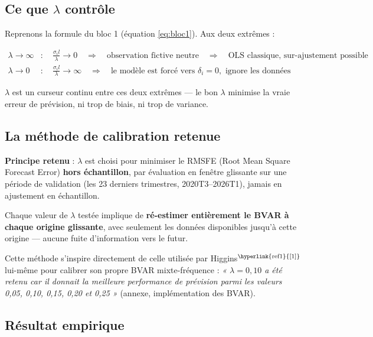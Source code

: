 \documentclass[11pt,a4paper]{article}
\newcommand{\cit}[1]{\textsuperscript{\hyperlink{ref#1}{[#1]}}}
\begin{document}
\subsection{Ce que $\lambda$ contrôle}

Reprenons la formule du bloc 1 (équation \ref{eq:bloc1}). Aux deux extrêmes :

\begin{align*}
\lambda \to \infty &: \quad \frac{\sigma_i l}{\lambda} \to 0 \quad\Rightarrow\quad \text{observation fictive neutre} \quad\Rightarrow\quad \text{OLS classique, sur-ajustement possible} \\
\lambda \to 0 &: \quad \frac{\sigma_i l}{\lambda} \to \infty \quad\Rightarrow\quad \text{le modèle est forcé vers } \delta_i=0, \text{ ignore les données}
\end{align*}

$\lambda$ est un curseur continu entre ces deux extrêmes --- le bon $\lambda$ minimise la vraie erreur de prévision, ni trop de biais, ni trop de variance.

\subsection{La méthode de calibration retenue}

\begin{definitionbox}
\textbf{Principe retenu} : $\lambda$ est choisi pour minimiser le RMSFE (Root Mean Square Forecast Error) \textbf{hors échantillon}, par évaluation en fenêtre glissante sur une période de validation (les 23 derniers trimestres, 2020T3--2026T1), jamais en ajustement en échantillon.

Chaque valeur de $\lambda$ testée implique de \textbf{ré-estimer entièrement le BVAR à chaque origine glissante}, avec seulement les données disponibles jusqu'à cette origine --- aucune fuite d'information vers le futur.
\end{definitionbox}

Cette méthode s'inspire directement de celle utilisée par Higgins$\cit{1}$ lui-même pour calibrer son propre BVAR mixte-fréquence : \emph{« $\lambda=0{,}10$ a été retenu car il donnait la meilleure performance de prévision parmi les valeurs 0,05, 0,10, 0,15, 0,20 et 0,25 »} (annexe, implémentation des BVAR).

\subsection{Résultat empirique}
\end{document}
